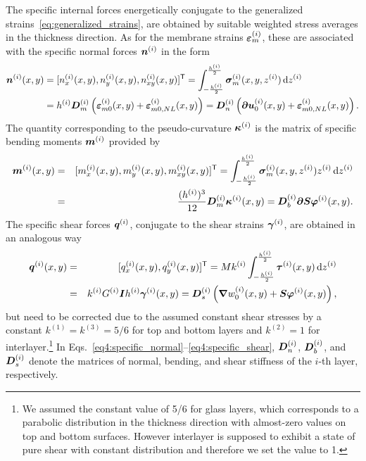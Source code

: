 \documentclass[11pt]{article}
\newcommand{\de}[1]{\,{\mathrm d}#1}
\newcommand{\curv}{\kappa} \newcommand{\curvx}{\kappa_x}
\newcommand{\normal}{n}
\newcommand{\shear}{q}
\newcommand{\bendy}{m}
\newcommand{\rot}{\varphi}
\newcommand{\strain}{\varepsilon}
\newcommand{\sstrain}{\gamma}
\newcommand{\m}{_m}
\newcommand{\mO}{_{m0}}
\newcommand{\mONL}{_{m0,NL}}
\newcommand{\Dm}{\mtrx{D}_m}
\newcommand{\Dn}{\mtrx{D}_n}
\newcommand{\Db}{\mtrx{D}_b}
\newcommand{\Ds}{\mtrx{D}_s}
\newcommand{\h}{h}
\newcommand{\correct}{k}
\newcommand{\G}{G}
\newcommand{\stress}{\sigma}
\newcommand{\sstress}{\tau}
\newcommand{\layer}[1]{^{(#1)}}
\newcommand{\lay}[1]{^{(#1)}}
\newcommand{\I}{\mtrx{I}}
\begin{document}
The specific internal forces energetically conjugate to the generalized strains~\eqref{eq:generalized_strains}, are obtained by suitable weighted stress averages in the thickness direction. As for the membrane strains $\mtrx{\strain}\m\layer{i}$, these are associated with the specific normal forces $\mtrx{\normal}\lay{i}$ in the form
\begin{align}
\mtrx{\normal}\layer{i}(x,y)
&
=
[\normal_x\layer{i}(x,y), \normal_y\layer{i}(x,y), \normal_{xy}\layer{i}(x,y)]\trn
=  
\int_{-\frac{\h\layer{i}}{2}}^{\frac{\h\layer{i}}{2}}
{\mtrx{\stress}\m\layer{i}(x,y,z\layer{i})}\de z\layer{i} 
\nonumber
\\
& = 
\h\layer{i} \Dm\layer{i} 
\left( 
  \mtrx{\strain}\mO\layer{i}(x,y) 
  +
  \mtrx{\strain}\mONL\layer{i}(x,y) 
\right) 
= 
\Dn\layer{i}
\left( 
  \pard\mtrx{u}\layer{i}_0(x,y) 
  + 
  \mtrx{\strain}\mONL\layer{i}(x,y) 
\right).
\label{eq4:specific_normal}
\end{align}
The quantity corresponding to the pseudo-curvature $\mtrx{\curv}\layer{i}$ is
the matrix of specific bending moments $\mtrx{\bendy}\layer{i}$ provided by
\begin{eqnarray}
\mtrx{\bendy}\layer{i}(x,y)
	&=& [\bendy_x\layer{i}(x,y), \bendy_y\layer{i}(x,y), \bendy_{xy}\layer{i}(x,y)]\trn
	 =  \int_{-\frac{\h\layer{i}}{2}}^{\frac{\h\layer{i}}{2}}{\mtrx{\stress}\m\layer{i}(x,y,z\layer{i})z\layer{i}}\de z\layer{i}\nonumber \\
	&=& \frac{(\h\layer{i})^3}{12} \Dm\layer{i} \mtrx{\curv}\layer{i}(x,y) =
	\Db\layer{i} \pard\mtrx{S}\mtrx{\rot}\layer{i}(x,y).
	\label{eq4:specific_moment}
\end{eqnarray}
The specific shear forces $\mtrx{\shear}\lay{i}$, conjugate to the shear strains
$\mtrx{\sstrain}\lay{i}$, are obtained in an analogous way
\begin{eqnarray}
\mtrx{\shear}\layer{i}(x,y)
	&=& [\shear_x\layer{i}(x,y), \shear_y\layer{i}(x,y)]\trn
	 =  M\correct\layer{i} \int_{-\frac{\h\layer{i}}{2}}^{\frac{\h\layer{i}}{2}}{\mtrx{\sstress}\layer{i}(x,y)}\de z\layer{i} \nonumber\\
	&=&  \correct\layer{i} \G\layer{i} \I \h\layer{i} \mtrx{\sstrain}\layer{i}(x,y) 
	 = \Ds\layer{i} \left(\mtrx{\nabla}w_0\layer{i}(x,y) + \mtrx{S}
	 \mtrx{\rot}\layer{i}(x,y)\right),
	 \label{eq4:specific_shear}
\end{eqnarray}
but need to be corrected due to the assumed constant shear stresses by a constant $\correct\layer{1} = \correct\layer{3} =5/6$ for top and bottom layers and $\correct\layer{2} = 1$ for interlayer.\footnote{We assumed the constant value of 5/6 for glass layers, which corresponds to a parabolic distribution in the thickness direction with almost-zero values on top and bottom surfaces. However interlayer is supposed to exhibit a state of pure shear with constant distribution and therefore we set the value to 1.} In Eqs.~\eqref{eq4:specific_normal}--\eqref{eq4:specific_shear}, $\Dn\lay{i}$, $\Db\lay{i}$, and $\Ds\lay{i}$ denote the matrices of normal, bending, and shear stiffness of the $i$-th layer, respectively.
\end{document}
